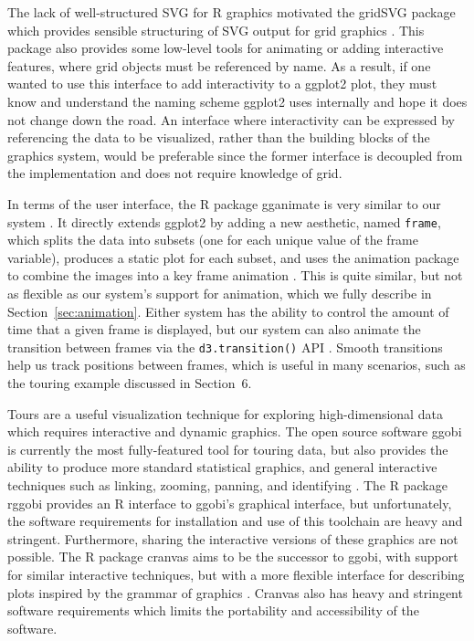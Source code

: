 \documentclass[journal]{vgtc}\usepackage[]{graphicx}\usepackage[]{color}
\begin{document}
The lack of well-structured SVG for R graphics motivated the gridSVG package which provides sensible structuring of SVG output for grid graphics \citep{gridSVG}. This package also provides some low-level tools for animating or adding interactive features, where grid objects must be referenced by name. As a result, if one wanted to use this interface to add interactivity to a ggplot2 plot, they must know and understand the naming scheme ggplot2 uses internally and hope it does not change down the road. An interface where interactivity can be expressed by referencing the data to be visualized, rather than the building blocks of the graphics system, would be preferable since the former interface is decoupled from the implementation and does not require knowledge of grid.

In terms of the user interface, the R package gganimate is very similar to our system \citep{gganimate}. It directly extends ggplot2 by adding a new aesthetic, named \texttt{frame}, which splits the data into subsets (one for each unique value of the frame variable), produces a static plot for each subset, and uses the animation package to combine the images into a key frame animation \citep{animation}. This is quite similar, but not as flexible as our system's support for animation, which we fully describe in Section~\ref{sec:animation}. Either system has the ability to control the amount of time that a given frame is displayed, but our system can also animate the transition between frames via the \texttt{d3.transition()} API \citep{d3}. Smooth transitions help us track positions between frames, which is useful in many scenarios, such as the touring example discussed in Section~6.

Tours are a useful visualization technique for exploring high-dimensional data which requires interactive and dynamic graphics. The open source software ggobi is currently the most fully-featured tool for touring data, but also provides the ability to produce more standard statistical graphics, and general interactive techniques such as linking, zooming, panning, and identifying \citep{ggobi:2007}. The R package rggobi \citep{rggobi} provides an R interface to ggobi's graphical interface, but unfortunately, the software requirements for installation and use of this toolchain are heavy and stringent. Furthermore, sharing the interactive versions of these graphics are not possible. The R package cranvas aims to be the successor to ggobi, with support for similar interactive techniques, but with a more flexible interface for describing plots inspired by the grammar of graphics \citep{cranvas}. Cranvas also has heavy and stringent software requirements which limits the portability and accessibility of the software.
\end{document}
